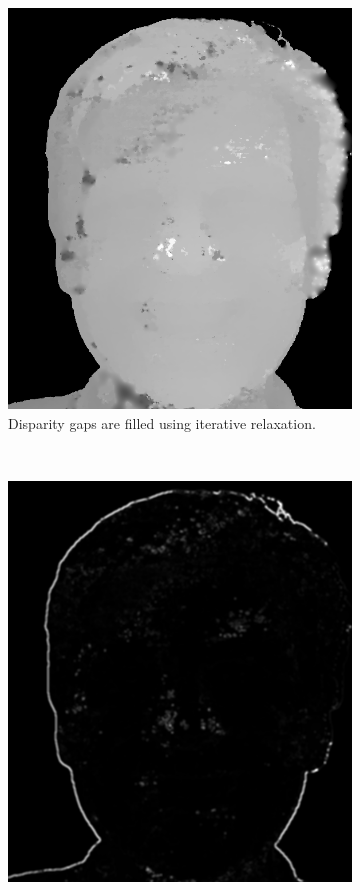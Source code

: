 \documentclass[journal]{IEEEtran}
\begin{document}
\begin{figure}[h]
\begin{subfigure}[t]{0.45\linewidth}
        \includegraphics[width=\linewidth]{Pics/disparity-fill.png}
        \caption{Disparity gaps are filled using iterative relaxation.}
        \label{fig:disparity-filled}
    \end{subfigure}
    ~
    \begin{subfigure}[t]{0.45\linewidth}
        \centering
        \includegraphics[width=\linewidth]{Pics/disparity-lapf.png}

\end{subfigure}
\end{figure}
\end{document}
